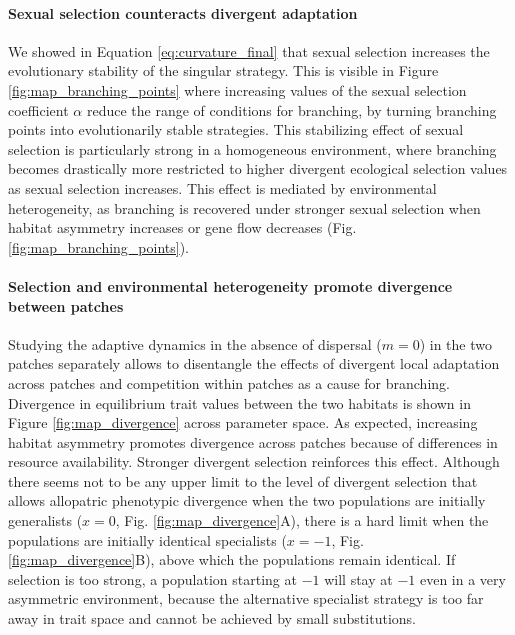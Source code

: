 
\paragraph{Sexual selection counteracts divergent adaptation} We showed in Equation \ref{eq:curvature_final} that sexual selection increases the evolutionary stability of the singular strategy. This is visible in Figure \ref{fig:map_branching_points} where increasing values of the sexual selection coefficient $\alpha$ reduce the range of conditions for branching, by turning branching points into evolutionarily stable strategies. This stabilizing effect of sexual selection is particularly strong in a homogeneous environment, where branching becomes drastically more restricted to higher divergent ecological selection values as sexual selection increases. This effect is mediated by environmental heterogeneity, as branching is recovered under stronger sexual selection when habitat asymmetry increases or gene flow decreases (Fig. \ref{fig:map_branching_points}).\\


\paragraph{Selection and environmental heterogeneity promote divergence between patches} Studying the adaptive dynamics in the absence of dispersal ($m = 0$) in the two patches separately allows to disentangle the effects of divergent local adaptation across patches and competition within patches as a cause for branching. Divergence in equilibrium trait values between the two habitats is shown in Figure \ref{fig:map_divergence} across parameter space. As expected, increasing habitat asymmetry promotes divergence across patches because of differences in resource availability. Stronger divergent selection reinforces this effect. Although there seems not to be any upper limit to the level of divergent selection that allows allopatric phenotypic divergence when the two populations are initially generalists ($x = 0$, Fig. \ref{fig:map_divergence}A), there is a hard limit when the populations are initially identical specialists ($x = -1$, Fig. \ref{fig:map_divergence}B), above which the populations remain identical. If selection is too strong, a population starting at $-1$ will stay at $-1$ even in a very asymmetric environment, because the alternative specialist strategy is too far away in trait space and cannot be achieved by small substitutions.\\

